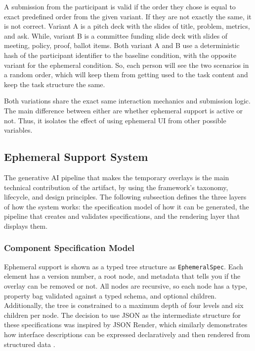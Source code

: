 A submission from the participant is valid if the order they chose is equal to exact predefined order from the given variant. If they are not exactly the same, it is not correct. Variant A is a pitch deck with the slides of title, problem, metrics, and ask. While, variant B is a committee funding slide deck with slides of meeting, policy, proof, ballot items. Both variant A and B use a deterministic hash of the participant identifier to the baseline condition, with the opposite variant for the ephemeral condition. So, each person will see the two scenarios in a random order, which will keep them from getting used to the task content and keep the task structure the same.

Both variations share the exact same interaction mechanics and submission logic. The main difference between either are whether ephemeral support is active or not. Thus, it isolates the effect of using ephemeral UI from other possible variables.

\subsection{Ephemeral Support System}


The generative AI pipeline that makes the temporary overlays is the main technical contribution of the artifact, by using the framework's taxonomy, lifecycle, and design principles. The following subsection defines the three layers of how the system works: the specification model of how it can be generated, the pipeline that creates and validates specifications, and the rendering layer that displays them.

\subsubsection{Component Specification Model}

Ephemeral support is shown as a typed tree structure as \texttt{EphemeralSpec}. Each element has a version number, a root node, and metadata that tells you if the overlay can be removed or not. All nodes are recursive, so each node has a type, property bag validated against a typed schema, and optional children. Additionally, the tree is constrained to a maximum depth of four levels and six children per node. The decision to use JSON as the intermediate structure for these specifications was inspired by JSON Render, which similarly demonstrates how interface descriptions can be expressed declaratively and then rendered from structured data \parencite{JsonRender}.

